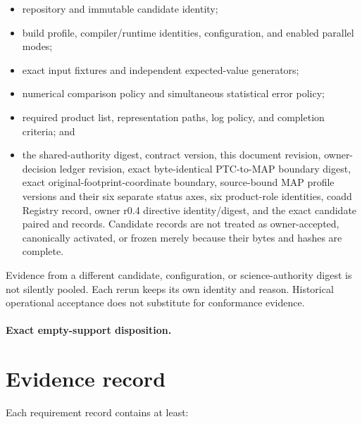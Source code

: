 \documentclass[10pt]{article}
\begin{document}
\begin{itemize}
\item repository and immutable candidate identity;
\item build profile, compiler/runtime identities, configuration, and enabled
parallel modes;
\item exact input fixtures and independent expected-value generators;
\item numerical comparison policy and simultaneous statistical error policy;
\item required product list, representation paths, log policy, and completion
criteria; and
\item the shared-authority digest, contract version, this document revision,
owner-decision ledger revision, exact byte-identical PTC-to-MAP boundary
digest, exact original-footprint-coordinate boundary, source-bound MAP
profile versions and their six separate status axes, six product-role
identities, coadd Registry record, owner r0.4 directive identity/digest, and
the exact candidate paired
\SCIMapCandidateVALRegistry{} and \SCIMapCandidateVALSourceRegister{} records.
Candidate records are not treated as owner-accepted, canonically activated, or
frozen merely because their bytes and hashes are complete.
\end{itemize}

Evidence from a different candidate, configuration, or science-authority
digest is not silently pooled. Each rerun keeps its own identity and reason.
Historical operational acceptance does not substitute for conformance
evidence.

\SCIMapLifecycleDefinition

\SCIMapLifecycleTable

\SCIMapAxisSeparationDefinition

\SCIMapAttemptOutcomeDefinition

\SCIMapCandidateProfileStatusDefinition

\paragraph{Exact empty-support disposition.}
\SCIMapEmptySupportDispositionBody

\section{Evidence record}

Each requirement record contains at least:
\end{document}
